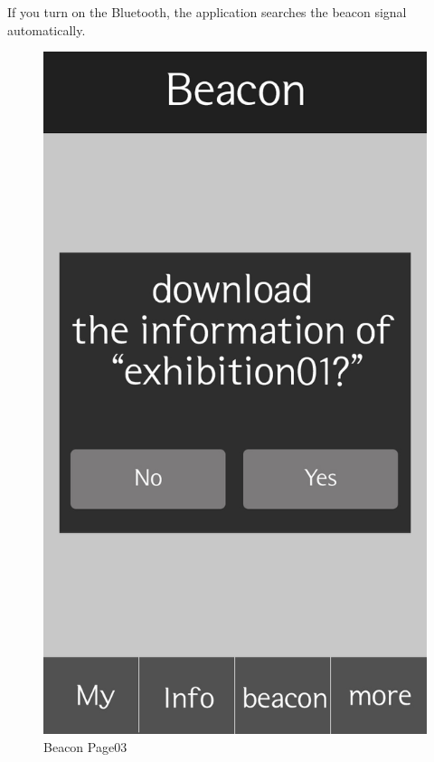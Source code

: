 \documentclass[conference]{IEEEtran}
\begin{document}
If you turn on the Bluetooth, the application searches the beacon signal automatically. \\

\begin{figure}[htbp]
\begin{center}
    \includegraphics[scale=0.15]{img_popup}
    \caption{Beacon Page03} 
\end{center}
\end{figure}
\end{document}
